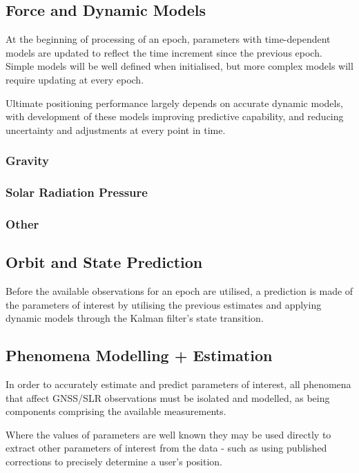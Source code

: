 \subsection{Force and Dynamic Models}

At the beginning of processing of an epoch, parameters with time-dependent models are updated to reflect the time increment since the previous epoch. Simple models will be well defined when initialised, but more complex models will require updating at every epoch.

Ultimate positioning performance largely depends on accurate dynamic models, with development of these models improving predictive capability, and reducing uncertainty and adjustments at every point in time.

\subsubsection{Gravity}
\subsubsection{Solar Radiation Pressure}
\subsubsection{Other}


\subsection{Orbit and State Prediction}

Before the available observations for an epoch are utilised, a prediction is made of the parameters of interest by utilising the previous estimates and applying dynamic models through the Kalman filter’s state transition.


\subsection{Phenomena Modelling + Estimation}

In order to accurately estimate and predict parameters of interest, all phenomena that affect GNSS/SLR observations must be isolated and modelled, as being components comprising the available measurements.

Where the values of parameters are well known they may be used directly to extract other parameters of interest from the data - such as using published corrections to precisely determine a user’s position.

